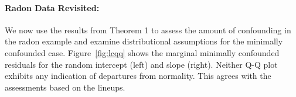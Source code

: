 \documentclass{article} %
\newcommand{\al}[1]{{\color{red} #1}}
\newcommand{\trans}{\ensuremath{^\prime}}
\newcommand{\var}{\ensuremath{\mathrm{Var}}}
\begin{document}
%
%
%
%



\clearpage
{}




\paragraph{Radon Data Revisited:}
We now use the results from Theorem 1 to assess the amount of confounding in the radon example and examine distributional assumptions for the minimally confounded case.
Figure~\ref{fig:lcqq} shows the marginal minimally confounded residuals for the random intercept (left) and slope (right). Neither Q-Q plot exhibits any indication of departures from normality. This agrees with the assessments based on the lineups. 
\end{document}
